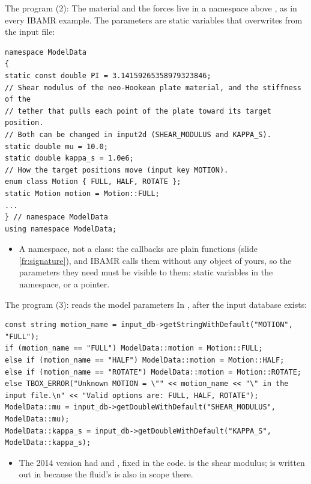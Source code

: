 \documentclass[aspectratio=169,11pt]{beamer}
\begin{document}
\begin{frame}[fragile]{The program (2): }
\label{fr:modeldata}
\footnotesize
The material and the forces live in a namespace above , as in every IBAMR example. The parameters are static variables that  overwrites from the input file:
\begin{lstlisting}[style=cpptiny]
namespace ModelData
{
static const double PI = 3.14159265358979323846;
// Shear modulus of the neo-Hookean plate material, and the stiffness of the
// tether that pulls each point of the plate toward its target position.
// Both can be changed in input2d (SHEAR_MODULUS and KAPPA_S).
static double mu = 10.0;
static double kappa_s = 1.0e6;
// How the target positions move (input key MOTION).
enum class Motion { FULL, HALF, ROTATE };
static Motion motion = Motion::FULL;
...
} // namespace ModelData
using namespace ModelData;
\end{lstlisting}
\begin{itemize}
  \item A namespace, not a class: the callbacks are plain functions (slide \ref{fr:signature}), and IBAMR calls them without any object of yours, so the parameters they need must be visible to them: static variables in the namespace, or a  pointer.
\end{itemize}
\end{frame}

\begin{frame}[fragile]{The program (3):  reads the model parameters}
\label{fr:modeldata2}
\footnotesize
In , after the input database exists:
\begin{lstlisting}[style=cpptiny]
const string motion_name = input_db->getStringWithDefault("MOTION", "FULL");
if (motion_name == "FULL") ModelData::motion = Motion::FULL;
else if (motion_name == "HALF") ModelData::motion = Motion::HALF;
else if (motion_name == "ROTATE") ModelData::motion = Motion::ROTATE;
else TBOX_ERROR("Unknown MOTION = \"" << motion_name << "\" in the input file.\n" << "Valid options are: FULL, HALF, ROTATE");
ModelData::mu = input_db->getDoubleWithDefault("SHEAR_MODULUS", ModelData::mu);
ModelData::kappa_s = input_db->getDoubleWithDefault("KAPPA_S", ModelData::kappa_s);
\end{lstlisting}
\begin{itemize}
  \item The 2014 version had  and , fixed in the code.  is the shear modulus;  is written out in  because the fluid's  is also in scope there.
\end{itemize}
\end{frame}
\end{document}
